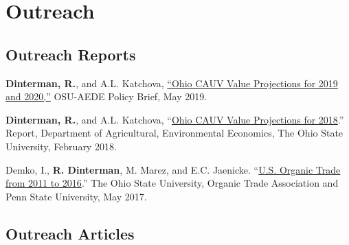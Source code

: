 \documentclass[letterpaper]{article}
\renewenvironment{itemize}{
  \begin{list}{}{
    \setlength{\leftmargin}{1.5em}
  }
}{
  \end{list}
}
\begin{document}
\section*{Outreach}

\subsection*{Outreach Reports}

\begin{itemize}
\item \textbf{Dinterman, R.}, and A.L. Katchova, \href{https://aede.osu.edu/sites/aede/files/publication_files/CAUVProjectionsReport2019.pdf}{``Ohio CAUV Value Projections for 2019 and 2020,''} OSU-AEDE Policy Brief, May 2019.
\item \textbf{Dinterman, R.}, and A.L. Katchova, ``\href{https://aede.osu.edu/sites/aede/files/publication_files/2018CAUVProjectionsReport.pdf}{Ohio CAUV Value Projections for 2018}.'' Report, Department of Agricultural, Environmental Economics, The Ohio State University, February 2018.
\item Demko, I., \textbf{R. Dinterman}, M. Marez, and E.C. Jaenicke. ``\href{https://ota.com/sites/default/files/indexed_files/OTATradeReport_10-30-2017.pdf}{U.S. Organic Trade from 2011 to 2016}.'' The Ohio State University, Organic Trade Association and Penn State University, May 2017.
\end{itemize}

% 

\subsection*{Outreach Articles}
\end{document}
